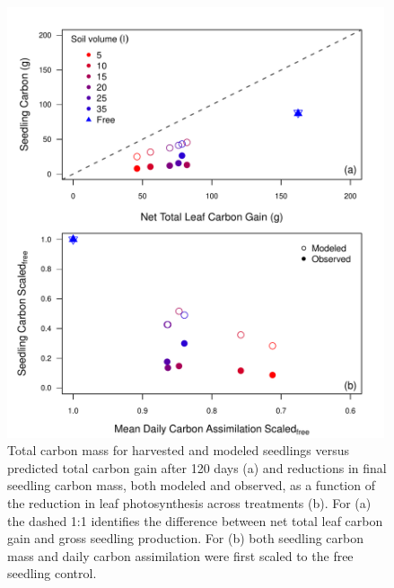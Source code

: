\documentclass[a4paper]{article}\usepackage[]{graphicx}\usepackage[]{color}
\begin{document}
\begin{figure}[h!]
    \centering
    \includegraphics[width=0.99\textwidth]{massmodel_totalC.pdf}
    \caption{Total carbon mass for harvested and modeled seedlings versus predicted total carbon gain after 120 days (a) and  reductions in final seedling carbon mass, both modeled and observed, as a function of the reduction in leaf photosynthesis across treatments (b). For (a) the dashed 1:1 identifies the difference between net total leaf carbon gain and gross seedling production. For (b) both seedling carbon mass and daily carbon assimilation were first scaled to the free seedling control.}
    \label{fig:figure 2.6}
\end{figure}
\end{document}
